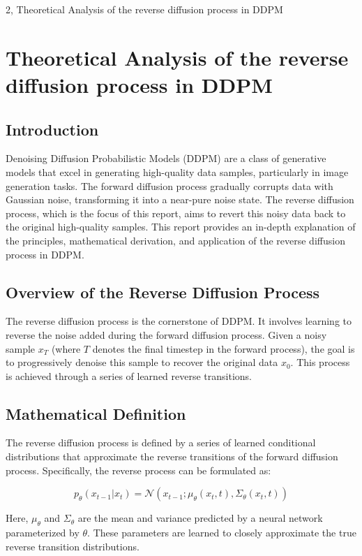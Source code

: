 \documentclass[10pt,a4paper]{article}
\begin{document}
\begin{task}{2,  Theoretical Analysis of the reverse diffusion process in DDPM}
\section{ Theoretical Analysis of the reverse diffusion process in DDPM}
\subsection{Introduction}

Denoising Diffusion Probabilistic Models (DDPM) are a class of generative models that excel in generating high-quality data samples, particularly in image generation tasks. The forward diffusion process gradually corrupts data with Gaussian noise, transforming it into a near-pure noise state. The reverse diffusion process, which is the focus of this report, aims to revert this noisy data back to the original high-quality samples. This report provides an in-depth explanation of the principles, mathematical derivation, and application of the reverse diffusion process in DDPM.

\subsection{Overview of the Reverse Diffusion Process}

The reverse diffusion process is the cornerstone of DDPM. It involves learning to reverse the noise added during the forward diffusion process. Given a noisy sample \( x_T \) (where \( T \) denotes the final timestep in the forward process), the goal is to progressively denoise this sample to recover the original data \( x_0 \). This process is achieved through a series of learned reverse transitions.

\subsection{Mathematical Definition}

The reverse diffusion process is defined by a series of learned conditional distributions that approximate the reverse transitions of the forward diffusion process. Specifically, the reverse process can be formulated as:

\[
p_\theta(x_{t-1} | x_t) = \mathcal{N}(x_{t-1}; \mu_\theta(x_t, t), \Sigma_\theta(x_t, t))
\]

Here, \( \mu_\theta \) and \( \Sigma_\theta \) are the mean and variance predicted by a neural network parameterized by \( \theta \). These parameters are learned to closely approximate the true reverse transition distributions.


\end{task}
\end{document}
